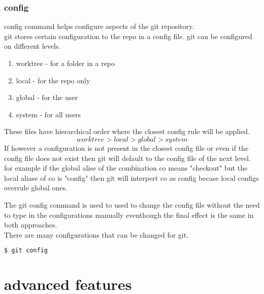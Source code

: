 \documentclass{book}
\begin{document}
\section{config}
config command helps configure aspects of the git repository.\\
git stores certain configuration to the repo in a config file.
git can be configured on different levels.
\begin{enumerate}
\item worktree - for a folder in a repo
\item local    - for the repo only
\item global   - for the user
\item system   - for all users
\end{enumerate}
These files have hierarchical order where the closest config rule will be applied. \\
$$worktree > local >  global > system $$
If however a configuration is not present in the closest config file or even if the config file 
does not exist then git will default to the config file of the next level.
for example 
if the global alise of the combination co means "checkout" but the local aliase of co is "config" then git will 
interpert co as config becase local configs overrule global ones.\par
The git config command is used to used to change the config file without the need to type in the configurations manually 
eventhough the final effect is the same in both approaches.\\
There are many configurations that can be changed for git.
\begin{lstlisting}[language=bash]
$ git config 
\end{lstlisting}




\part{advanced features}
\end{document}
